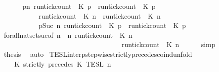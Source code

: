 \begin{isabellebody}
\ {\isacharminus}\isanewline
\ \ \isamarkupfalse%
\ {\isacartoucheopen}{\isacharbraceleft}{\isasymrho}{\isachardot}\ {\isasymforall}p{\isasymge}n{\isachardot}\ {\isacharparenleft}run{\isacharunderscore}tick{\isacharunderscore}count\ {\isasymrho}\ K\ p{\isacharparenright}\ {\isasymle}\ {\isacharparenleft}run{\isacharunderscore}tick{\isacharunderscore}count\ {\isasymrho}\ K\ p{\isacharparenright}{\isacharbraceright}\isanewline
\ \ \ \ \ \ \ \ \ {\isacharequal}\ {\isacharbraceleft}{\isasymrho}{\isachardot}\ {\isacharparenleft}run{\isacharunderscore}tick{\isacharunderscore}count\ {\isasymrho}\ K\ n{\isacharparenright}\ {\isasymle}\ {\isacharparenleft}run{\isacharunderscore}tick{\isacharunderscore}count\ {\isasymrho}\ K\ n{\isacharparenright}{\isacharbraceright}\isanewline
\ \ \ \ \ \ \ \ \ {\isasyminter}\ {\isacharbraceleft}{\isasymrho}{\isachardot}\ {\isasymforall}p{\isasymge}Suc\ n{\isachardot}\ {\isacharparenleft}run{\isacharunderscore}tick{\isacharunderscore}count\ {\isasymrho}\ K\ p{\isacharparenright}\ {\isasymle}\ {\isacharparenleft}run{\isacharunderscore}tick{\isacharunderscore}count\ {\isasymrho}\ K\ p{\isacharparenright}{\isacharbraceright}{\isacartoucheclose}\isanewline
\ \ \ \ \isamarkupfalse%
\ forall{\isacharunderscore}nat{\isacharunderscore}set{\isacharunderscore}suc{\isacharbrackleft}of\ {\isacartoucheopen}n{\isacartoucheclose}\ {\isacartoucheopen}{\isasymlambda}{\isasymrho}\ n{\isachardot}\ {\isacharparenleft}run{\isacharunderscore}tick{\isacharunderscore}count\ {\isasymrho}\ K\ n{\isacharparenright}\isanewline
\ \ \ \ \ \ \ \ \ \ \ \ \ \ \ \ \ \ \ \ \ \ \ \ \ \ \ \ \ \ \ \ \ \ {\isasymle}\ {\isacharparenleft}run{\isacharunderscore}tick{\isacharunderscore}count\ {\isasymrho}\ K\ n{\isacharparenright}{\isacartoucheclose}{\isacharbrackright}\isanewline
\ \ \ \ \isamarkupfalse%
\ simp\isanewline
\ \ \isamarkupfalse%
\ {\isacharquery}thesis\ \isamarkupfalse%
\ auto\isanewline
{}\isamarkupfalse%
%
\endisatagproof
{\isafoldproof}%
%
\isadelimproof
\isanewline
%
\endisadelimproof
\isanewline
{}\isamarkupfalse%
\ TESL{\isacharunderscore}interp{\isacharunderscore}stepwise{\isacharunderscore}strictly{\isacharunderscore}precedes{\isacharunderscore}coind{\isacharunderscore}unfold{\isacharcolon}\isanewline
\ \ \ {\isacartoucheopen}{\isasymlbrakk}\ K\ strictly\ precedes\ K\ {\isasymrbrakk}\isactrlsub T\isactrlsub E\isactrlsub S\isactrlsub L\isactrlbsup {\isasymge}\ n\isactrlesup \ {\isacharequal}\ \ \ \ \ \ \ \ \ \ \ \ \ \ \ %

\end{isabellebody}
